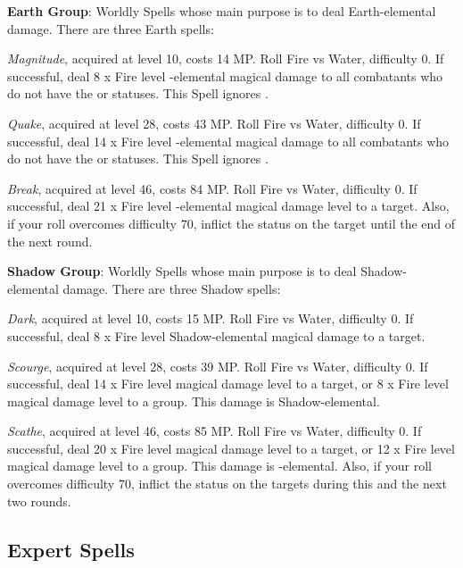 \begin{multicols}{2}
    \textbf{Earth Group}: Worldly Spells whose main purpose is to deal Earth-elemental damage. There are three Earth spells:
    
    \textit{Magnitude}, acquired at level 10, costs 14 MP\@. Roll Fire vs Water, difficulty 0. If successful, deal 8 x Fire level -elemental magical damage to all combatants who do not have the  or  statuses. This Spell ignores .
    
    \textit{Quake}, acquired at level 28, costs 43 MP\@. Roll Fire vs Water, difficulty 0. If successful, deal 14 x Fire level -elemental magical damage to all combatants who do not have the  or  statuses. This Spell ignores .
    
    \textit{Break}, acquired at level 46, costs 84 MP\@. Roll Fire vs Water, difficulty 0. If successful, deal 21 x Fire level -elemental magical damage level to a target. Also, if your roll overcomes difficulty 70, inflict the  status on the target until the end of the next round.

    \ffcrystal[type=level,height=8pt]

    \textbf{Shadow Group}: Worldly Spells whose main purpose is to deal Shadow-elemental damage. There are three Shadow spells:

    \textit{Dark}, acquired at level 10, costs 15 MP\@. Roll Fire vs Water, difficulty 0. If successful, deal 8 x Fire level {Shadow}-elemental magical damage to a target.

    \textit{Scourge}, acquired at level 28, costs 39 MP\@. Roll Fire vs Water, difficulty 0. If successful, deal 14 x Fire level magical damage level to a target, or 8 x Fire level magical damage level to a group. This damage is {Shadow}-elemental.

    \textit{Scathe}, acquired at level 46, costs 85 MP\@. Roll Fire vs Water, difficulty 0. If successful, deal 20 x Fire level magical damage level to a target, or 12 x Fire level magical damage level to a group. This damage is -elemental. Also, if your roll overcomes difficulty 70, inflict the  status on the targets during this and the next two rounds.

    \subsection{Expert Spells}\label{subsec:black-expert}


\end{multicols}
